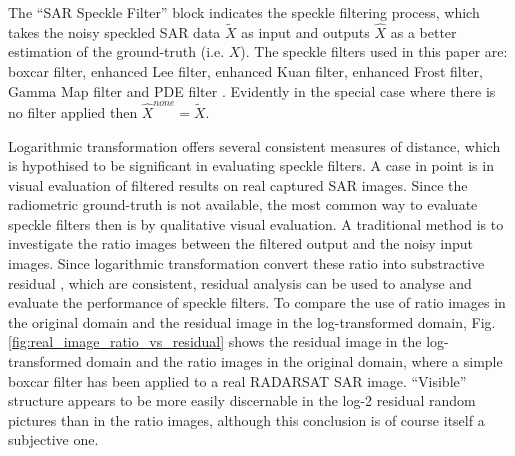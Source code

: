 \documentclass[journal]{IEEEtran}
\begin{document}
The ``SAR Speckle Filter'' block indicates the speckle filtering process, 
	which takes the noisy speckled SAR data $\tilde{X}$ as input
	and outputs $\hat{X}$ as a better estimation of the ground-truth (i.e. $X$).
The speckle filters used in this paper are: 
	boxcar filter, enhanced Lee filter, enhanced Kuan filter, enhanced Frost filter, Gamma Map filter and PDE filter \cite{You_TIP_2000}.
Evidently in the special case where there is no filter applied then $\hat{X}^{none} = \tilde{X}$.

Logarithmic transformation offers several consistent measures of distance, 
	which is hypothised to be significant  in evaluating speckle filters.
	A case in point is in visual evaluation of filtered results on real captured SAR images.
Since the radiometric ground-truth is not available, %
	the most common way to evaluate speckle filters then is by qualitative visual evaluation.
A traditional method is to investigate the ratio images between the filtered output and the noisy input images.
Since logarithmic transformation convert these ratio into substractive residual
	, which are consistent, residual analysis can be used to analyse and evaluate the performance of speckle filters.
To compare the use of ratio images in the original domain and the residual image in the log-transformed domain, Fig. \ref{fig:real_image_ratio_vs_residual} shows the residual image in the log-transformed domain and the ratio images in the original domain, where a simple boxcar filter has been applied to a real RADARSAT SAR image.
``Visible'' structure appears to be more easily discernable in the log-2 residual random pictures than in the ratio images, although this conclusion is of course itself a subjective one.

\end{document}
